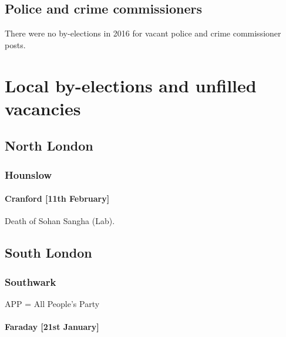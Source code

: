 \documentclass[a4paper,openany]{book}
\begin{document}
\section{Police and crime commissioners}

There were no by-elections in 2016 for vacant police and crime commissioner posts.

\chapter{Local by-elections and unfilled vacancies}

\begin{resultsiii}

\section{North London}

\subsection*{Hounslow}

\subsubsection*{Cranford \hspace*{\fill}\nolinebreak[1]%
\enspace\hspace*{\fill}
[11th February]}


Death of Sohan Sangha (Lab).

\section{South London}

\subsection*{Southwark}

APP = All People's Party

\subsubsection*{Faraday \hspace*{\fill}\nolinebreak[1]%
\enspace\hspace*{\fill}
[21st January]}


\end{resultsiii}
\end{document}
